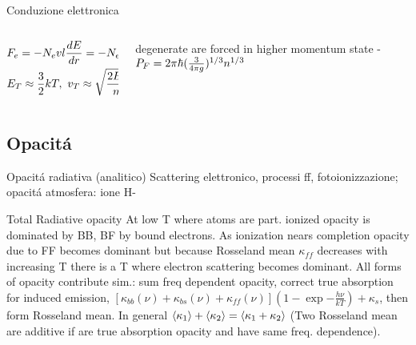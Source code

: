 \begin{frame}{Conduzione elettronica}
\begin{columns}[T]
\begin{column}{0.5\textwidth}
	\begin{align*}
	&F_e=-N_evl\TDy{r}{E}=-N_ekvl\TDy{r}{T}\\
	&E_T\approx\frac{3}{2}kT,\ v_T\approx\sqrt{\frac{2E_T}{m}}
	\end{align*}
\end{column}
\begin{column}{0.5\textwidth}
	\Pelectron degenerate are forced in higher momentum state - $P_F=2\pi\hbar(\frac{3}{4\pi g})\expy{1/3}n\expy{1/3}$
\end{column}
\end{columns}
\end{frame}

\subsection{Opacit\'a}

\begin{frame}{Opacit\'a radiativa (analitico)}
Scattering elettronico, processi ff, fotoionizzazione; opacit\'a atmosfera: ione H-
\end{frame}

\begin{frame}{Total Radiative opacity}
    At low T where atoms are part. ionized opacity is dominated by BB, BF by bound electrons. As ionization nears completion opacity due to FF becomes dominant but because Rosseland mean  $\kappa_{ff}$ decreases with increasing T there is a T where electron scattering becomes dominant. All forms of opacity contribute sim.: sum freq dependent opacity, correct true absorption for induced emission, $[\kappa_{bb}(\nu)+\kappa_{bs}(\nu)+\kappa_{ff}(\nu)](1-\exp{-\frac{h\nu}{kT}})+\kappa_s$, then form Rosseland mean. In general $\exv{\kappa_1}+\exv{\kappa_2}=\exv{\kappa_1+\kappa_2}$ (Two Rosseland mean are additive if are true absorption opacity and have same freq. dependence).
\end{frame}

